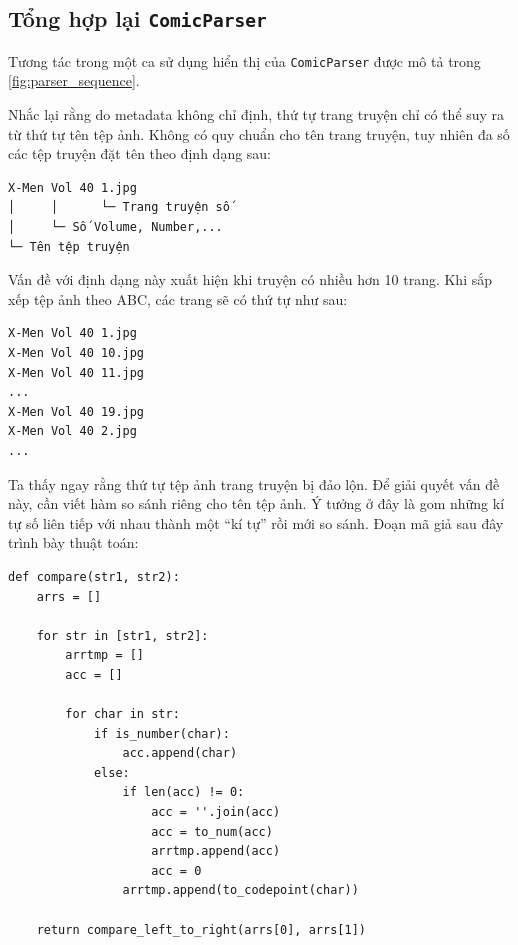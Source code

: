 \documentclass[../../../../thesis]{subfiles}
\begin{document}

\subsection{Tổng hợp lại \texttt{ComicParser}}

Tương tác trong một ca sử dụng hiển thị của \texttt{ComicParser} được mô tả
trong \autoref{fig:parser_sequence}.

Nhắc lại rằng do metadata không chỉ định, thứ tự trang truyện chỉ có thể suy ra
từ thứ tự tên tệp ảnh. Không có quy chuẩn cho tên trang truyện, tuy nhiên đa số
các tệp truyện đặt tên theo định dạng sau:

\begin{verbatim}
X-Men Vol 40 1.jpg
│     │      └─ Trang truyện số
│     └─ Số Volume, Number,...
└─ Tên tệp truyện
\end{verbatim}

Vấn đề với định dạng này xuất hiện khi truyện có nhiều hơn 10 trang. Khi sắp xếp
tệp ảnh theo ABC, các trang sẽ có thứ tự như sau:

\begin{verbatim}
X-Men Vol 40 1.jpg
X-Men Vol 40 10.jpg
X-Men Vol 40 11.jpg
...
X-Men Vol 40 19.jpg
X-Men Vol 40 2.jpg
...
\end{verbatim}

Ta thấy ngay rằng thứ tự tệp ảnh trang truyện bị đảo lộn. Để giải quyết vấn đề
này, cần viết hàm so sánh riêng cho tên tệp ảnh. Ý tưởng ở đây là gom những kí
tự số liên tiếp với nhau thành một ``kí tự'' rồi mới so sánh. Đoạn mã giả sau
đây trình bày thuật toán:

\begin{Verbatim}[samepage=true]
def compare(str1, str2):
    arrs = []

    for str in [str1, str2]:
        arrtmp = []
        acc = []

        for char in str:
            if is_number(char):
                acc.append(char)
            else:
                if len(acc) != 0:
                    acc = ''.join(acc)
                    acc = to_num(acc)
                    arrtmp.append(acc)
                    acc = 0
                arrtmp.append(to_codepoint(char))

    return compare_left_to_right(arrs[0], arrs[1])
\end{Verbatim}
\end{document}
